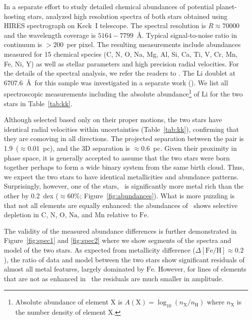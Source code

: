 \documentclass[modern, letterpaper]{aastex61}
\newcommand{\figname}{Figure}
\newcommand*\elem[1]{\ensuremath{\mathrm{#1}}}
\newcommand*\elemH[1]{\ensuremath{[\mathrm{#1}/\elem{H}]}}
\newcommand*{\feh}{\ensuremath{\elemH{Fe}}}
\newcommand{\bizarreone}{\text{Kronos}}
\begin{document}
In a separate effort to study detailed chemical abundances of potential
planet-hosting stars, \citet{2016ApJS..225...32B} analyzed high resolution
spectra of both stars obtained using HIRES spectrograph on Keck~I telescope.
The spectral resolution is $R\approx 70000$ and the wavelength coverage is
$5164-7799$~\AA.
Typical signal-to-noise ratio in continuum is $>200$~per pixel.
The resulting measurements include abundances measured for 15 chemical species
(C, N, O, Na, Mg, Al, Si, Ca, Ti, V, Cr, Mn, Fe, Ni, Y) as well as stellar parameters
and high precision radial velocities.
For the details of the spectral analysis, we refer the readers to
\citealt{2016ApJS..225...32B}.
The \elem{Li} doublet at $6707.6$~\AA\ for this sample was
investigated in a separate work (\citealt{jmlithium}).
We list all spectroscopic measurements including
the absolute abundance\footnote{
  Absolute abundance of element \elem{X} is $A(\elem{X}) = \log_{10} (n_\elem{X}/n_\elem{H})$
  where $n_\elem{X}$ is the number density of element \elem{X}.
} of \elem{Li} for the two stars in Table~\ref{tab:kk}.


Although selected based only on their proper motions, the two stars
have identical radial velocities within uncertainties (Table~\ref{tab:kk}),
confirming that they are comoving in all directions.
The projected separation between the pair is 1.9\arcmin\ ($\approx 0.01$~pc),
and the 3D separation is $\approx 0.6$~pc.
Given their proximity in phase space, it is generally accepted to assume that
the two stars were born together perhaps to form a wide binary system from the
same birth cloud.
Thus, we expect the two stars to have identical metallicities and abundance patterns.
Surprisingly, however, one of the stars, \bizarreone\ is significantly more metal
rich than the other by 0.2~dex ($\approx 60\%$; \figname~\ref{fig:abundances}).
What is more puzzling is that not all elements are equally enhanced:
the abundances of \bizarreone\ shows selective depletion in
\elem{C}, \elem{N}, \elem{O}, \elem{Na}, and \elem{Mn}
relative to \elem{Fe}.

The validity of the measured abundance differences is further demonstrated
in \figname~\ref{fig:spec1} and \ref{fig:spec2} where we show
segments of the spectra and model of the two stars.
As expected from metallicity difference ($\Delta\feh \approx 0.2$),
the ratio of data and model between the two stars show significant
residuals of almost all metal features, largely dominated by \elem{Fe}.
However, for lines of elements that are not as enhanced in \bizarreone\,
the residuals are much smaller in amplitude.
\end{document}
